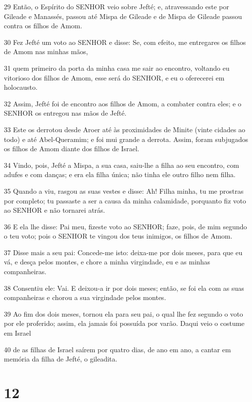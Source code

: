 \par 29 Então, o Espírito do SENHOR veio sobre Jefté; e, atravessando este por Gileade e Manassés, passou até Mispa de Gileade e de Mispa de Gileade passou contra os filhos de Amom.
\par 30 Fez Jefté um voto ao SENHOR e disse: Se, com efeito, me entregares os filhos de Amom nas minhas mãos,
\par 31 quem primeiro da porta da minha casa me sair ao encontro, voltando eu vitorioso dos filhos de Amom, esse será do SENHOR, e eu o oferecerei em holocausto.
\par 32 Assim, Jefté foi de encontro aos filhos de Amom, a combater contra eles; e o SENHOR os entregou nas mãos de Jefté.
\par 33 Este os derrotou desde Aroer até às proximidades de Minite (vinte cidades ao todo) e até Abel-Queramim; e foi mui grande a derrota. Assim, foram subjugados os filhos de Amom diante dos filhos de Israel.
\par 34 Vindo, pois, Jefté a Mispa, a sua casa, saiu-lhe a filha ao seu encontro, com adufes e com danças; e era ela filha única; não tinha ele outro filho nem filha.
\par 35 Quando a viu, rasgou as suas vestes e disse: Ah! Filha minha, tu me prostras por completo; tu passaste a ser a causa da minha calamidade, porquanto fiz voto ao SENHOR e não tornarei atrás.
\par 36 E ela lhe disse: Pai meu, fizeste voto ao SENHOR; faze, pois, de mim segundo o teu voto; pois o SENHOR te vingou dos teus inimigos, os filhos de Amom.
\par 37 Disse mais a seu pai: Concede-me isto: deixa-me por dois meses, para que eu vá, e desça pelos montes, e chore a minha virgindade, eu e as minhas companheiras.
\par 38 Consentiu ele: Vai. E deixou-a ir por dois meses; então, se foi ela com as suas companheiras e chorou a sua virgindade pelos montes.
\par 39 Ao fim dos dois meses, tornou ela para seu pai, o qual lhe fez segundo o voto por ele proferido; assim, ela jamais foi possuída por varão. Daqui veio o costume em Israel
\par 40 de as filhas de Israel saírem por quatro dias, de ano em ano, a cantar em memória da filha de Jefté, o gileadita.

\chapter{12}

